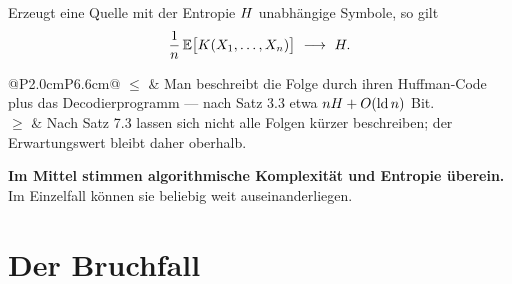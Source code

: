 \begin{merksatz}
Erzeugt eine Quelle mit der Entropie $H$ unabhängige Symbole, so gilt
\[ \frac{1}{n}\,\mathbb{E}\bigl[K(X_1,\ldots,X_n)\bigr] \ \longrightarrow\ H . \]

\begin{center}
{\small
\renewcommand{\arraystretch}{1.5}
\begin{tabular}{@{}P{2.0cm}P{6.6cm}@{}}
\toprule
\textbf{$\le$} & Man beschreibt die Folge durch ihren Huffman-Code plus das Decodierprogramm --- nach Satz 3.3 etwa $nH + O(\operatorname{ld} n)$ Bit.\\
\textbf{$\ge$} & Nach Satz 7.3 lassen sich nicht alle Folgen kürzer beschreiben; der Erwartungswert bleibt daher oberhalb.\\
\bottomrule
\end{tabular}}
\end{center}

\begin{center}
\begin{minipage}{0.9\textwidth}
\textbf{Im Mittel stimmen algorithmische Komplexität und Entropie überein.} Im Einzelfall können sie beliebig weit auseinanderliegen.
\end{minipage}
\end{center}

\begin{center}
\begin{minipage}{0.88\textwidth}
\end{minipage}
\end{center}
\end{merksatz}

\section{Der Bruchfall}


